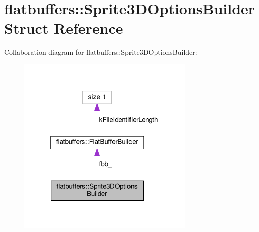 \hypertarget{structflatbuffers_1_1Sprite3DOptionsBuilder}{}\section{flatbuffers\+:\+:Sprite3\+D\+Options\+Builder Struct Reference}
\label{structflatbuffers_1_1Sprite3DOptionsBuilder}


Collaboration diagram for flatbuffers\+:\+:Sprite3\+D\+Options\+Builder\+:
\nopagebreak
\begin{figure}[H]
\begin{center}
\leavevmode
\includegraphics[width=241pt]{structflatbuffers_1_1Sprite3DOptionsBuilder__coll__graph}
\end{center}
\end{figure}
